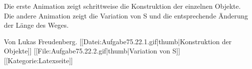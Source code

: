 Die erste Animation zeigt schrittweise die Konstruktion der einzelnen Objekte. Die andere Animation zeigt die Variation von S und die entsprechende Änderung der Länge des Weges.

Von Lukas Freudenberg.
[[Datei:Aufgabe75.22.1.gif|thumb|Konstruktion der Objekte]]
[[File:Aufgabe75.22.2.gif|thumb|Variation von S]] [[Kategorie:Latexseite]]
